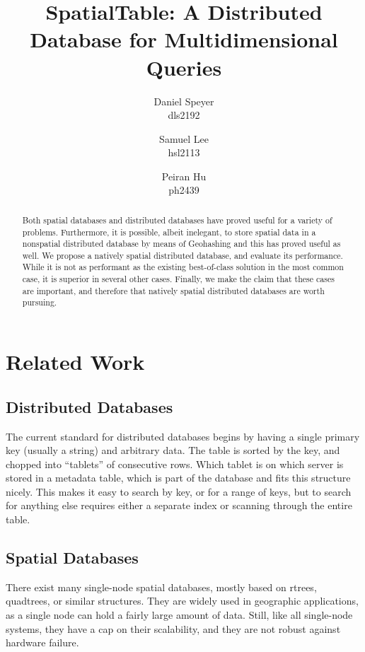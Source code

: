 \documentclass[11pt]{article}
\begin{document}
\author{Daniel Speyer\\dls2192 \and Samuel Lee\\hsl2113 \and Peiran Hu\\ph2439}
\title{SpatialTable: A Distributed Database for Multidimensional Queries}



\maketitle

\begin{abstract}
Both spatial databases and distributed databases have proved useful for a variety of problems.  Furthermore, it is possible, albeit inelegant, to store spatial data in a nonspatial distributed database by means of Geohashing and this has proved useful as well.  We propose a natively spatial distributed database, and evaluate its performance.  While it is not as performant as the existing best-of-class solution in the most common case, it is superior in several other cases.  Finally, we make the claim that these cases are important, and therefore that natively spatial distributed databases are worth pursuing.
\end{abstract}

\section{Related Work}

\subsection{Distributed Databases}

The current standard for distributed databases begins by having a single primary key (usually a string) and arbitrary data. The table is sorted by the key, and chopped into ``tablets'' of consecutive rows. Which tablet is on which server is stored in a metadata table, which is part of the database and fits this structure nicely. This makes it easy to search by key, or for a range of keys, but to search for anything else requires either a separate index or scanning through the entire table.

\subsection{Spatial Databases}

There exist many single-node spatial databases, mostly based on rtrees\cite{rtrees}, quadtrees\cite{quadtrees}, or similar structures\cite{samet}. They are widely used in geographic applications, as a single node can hold a fairly large amount of data. Still, like all single-node systems, they have a cap on their scalability, and they are not robust against hardware failure.
\end{document}
